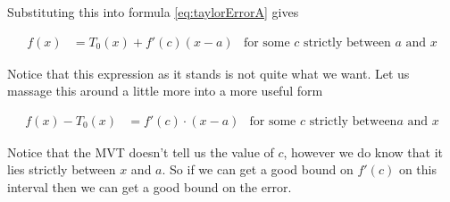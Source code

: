 Substituting this into formula \eqref{eq:taylorErrorA} gives
\begin{impeqn}\label{eq:taylorErrorL}
\begin{align*}
  f(x) &=T_0(x) +f'(c)(x-a) & \text{for some $c$ strictly between $a$ and $x$}
\end{align*}
\end{impeqn}
Notice that this expression as it stands is not quite what we want. Let us massage this
around a little more into a more useful form
\begin{impeqn}\label{eq:taylorErrorL2}
 \begin{align*}
  f(x) - T_0(x) &= f'(c) \cdot (x-a) & \text{for some $c$ strictly between
$a$ and $x$}
\end{align*}
\end{impeqn}
Notice that the MVT doesn't tell us the value of $c$, however we do know that it lies
strictly between $x$ and $a$. So if we can get a good bound on $f'(c)$ on this interval
then we can get a good bound on the error.

